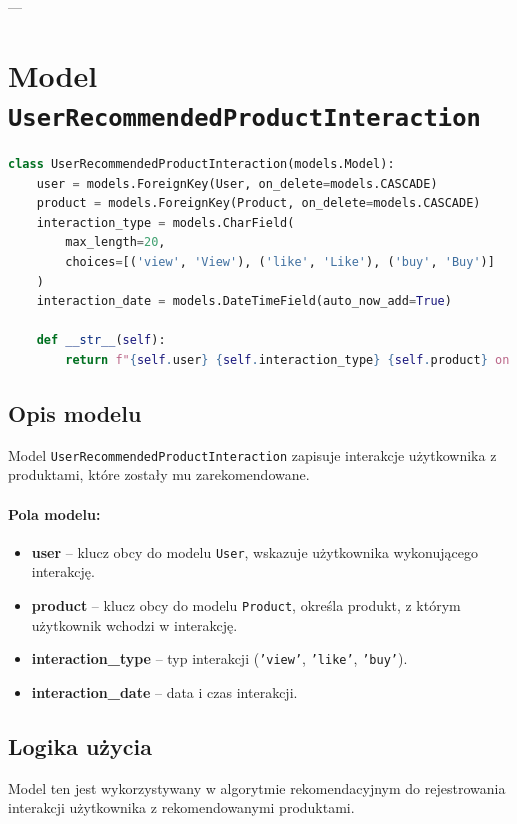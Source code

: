 \documentclass[12pt,a4paper,oneside]{article}
\theoremstyle{definition}
\numberwithin{equation}{section}
\begin{document}
---

\section{Model \texttt{UserRecommendedProductInteraction}}

\begin{lstlisting}[language=Python]
class UserRecommendedProductInteraction(models.Model):
    user = models.ForeignKey(User, on_delete=models.CASCADE)
    product = models.ForeignKey(Product, on_delete=models.CASCADE)
    interaction_type = models.CharField(
        max_length=20,
        choices=[('view', 'View'), ('like', 'Like'), ('buy', 'Buy')]
    )
    interaction_date = models.DateTimeField(auto_now_add=True)

    def __str__(self):
        return f"{self.user} {self.interaction_type} {self.product} on {self.interaction_date}"
\end{lstlisting}

\subsection*{Opis modelu}
Model \texttt{UserRecommendedProductInteraction} zapisuje interakcje użytkownika z produktami, które zostały mu zarekomendowane. 

\paragraph{Pola modelu:}
\begin{itemize}
    \item \textbf{user} -- klucz obcy do modelu \texttt{User}, wskazuje użytkownika wykonującego interakcję.
    \item \textbf{product} -- klucz obcy do modelu \texttt{Product}, określa produkt, z którym użytkownik wchodzi w interakcję.
    \item \textbf{interaction\_type} -- typ interakcji (\texttt{'view'}, \texttt{'like'}, \texttt{'buy'}).
    \item \textbf{interaction\_date} -- data i czas interakcji.
\end{itemize}

\subsection*{Logika użycia}
Model ten jest wykorzystywany w algorytmie rekomendacyjnym do rejestrowania interakcji użytkownika z rekomendowanymi produktami.
\end{document}
